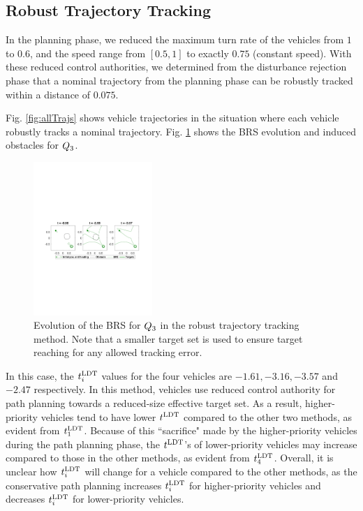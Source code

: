 \subsection{Robust Trajectory Tracking}
In the planning phase, we reduced the maximum turn rate of the vehicles from $1$ to $0.6$, and the speed range from $[0.5, 1]$ to exactly $0.75$ (constant speed). With these reduced control authorities, we determined from the disturbance rejection phase that a nominal trajectory from the planning phase can be robustly tracked within a distance of $0.075$.

Fig. \ref{fig:allTrajs} shows vehicle trajectories in the situation where each vehicle robustly tracks a nominal trajectory. Fig. \ref{fig:rtt_rs3} shows the BRS evolution and induced obstacles for $Q_3$. %
%
%
\begin{figure}[H]
  \centering
  \includegraphics[width=0.4\textwidth]{"fig/rtt_rs3"}
  \caption{Evolution of the BRS for $Q_3$ in the robust trajectory tracking method. Note that a smaller target set is used to ensure target reaching for any allowed tracking error.}
  \label{fig:rtt_rs3}
\end{figure}

In this case, the $t^\text{LDT}_i$ values for the four vehicles are $-1.61, -3.16, -3.57$ and $-2.47$ respectively. In this method, vehicles use reduced control authority for path planning towards a reduced-size effective target set. As a result, higher-priority vehicles tend to have lower $t^\text{LDT}$ compared to the other two methods, as evident from $t^\text{LDT}_1$. Because of this ``sacrifice" made by the higher-priority vehicles during the path planning phase, the $t^\text{LDT}$'s of lower-priority vehicles may increase compared to those in the other methods, as evident from $t^\text{LDT}_4$. Overall, it is unclear how $t^\text{LDT}_i$ will change for a vehicle compared to the other methods, as the conservative path planning increases $t^\text{LDT}_i$ for higher-priority vehicles and decreases $t^\text{LDT}_i$ for lower-priority vehicles.